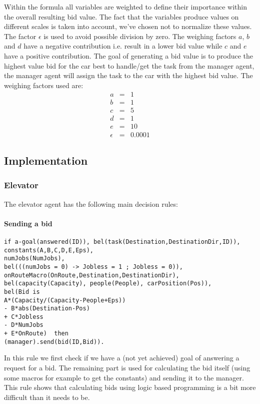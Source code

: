 \documentclass[a4paper,11pt]{article}
\begin{document}
Within the formula all variables are weighted to define their importance within the overall resulting bid value. The fact that the variables produce values on different scales is taken into account, we've chosen not to normalize these values. The factor $\epsilon$ is used to avoid possible division by zero. The weighing factors $a$, $b$ and $d$ have a negative contribution i.e. result in a lower bid value while $c$ and $e$ have a positive contribution. The goal of generating a bid value is to produce the highest value bid for the car best to handle/get the task from the manager agent, the manager agent will assign the task to the car with the highest bid value. The weighing factors used are:
\[\begin{array}{lcl}
a & = & 1\\
b & = & 1\\
c & = & 5\\
d & = & 1\\
e & = & 10\\
\epsilon & = & 0.0001
\end{array}\]

\subsection{Implementation}
\subsubsection{Elevator}
The elevator agent has the following main decision rules:

\paragraph*{Sending a bid}
\begin{verbatim}
if a-goal(answered(ID)), bel(task(Destination,DestinationDir,ID)),
constants(A,B,C,D,E,Eps),
numJobs(NumJobs),		
bel(((numJobs = 0) -> Jobless = 1 ; Jobless = 0)),
onRouteMacro(OnRoute,Destination,DestinationDir),
bel(capacity(Capacity), people(People), carPosition(Pos)),
bel(Bid is 
A*(Capacity/(Capacity-People+Eps)) 
- B*abs(Destination-Pos)
+ C*Jobless
- D*NumJobs
+ E*OnRoute)  then
(manager).send(bid(ID,Bid)).
\end{verbatim}

In this rule we first check if we have a (not yet achieved) goal of answering a request for a bid. The remaining part is used for calculating the bid itself (using some macros for example to get the constants) and sending it to the manager. This rule shows that calculating bids using logic based programming is a bit more difficult than it needs to be.
\end{document}
